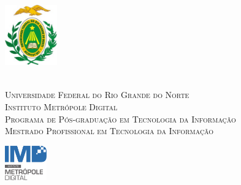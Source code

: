 

\begin{titlingpage}
	\begin{center}
		\hspace*{-1.5cm}
		\begin{minipage}{2.2cm}
			\begin{center}
				\includegraphics[width=2.25cm, height=2.68cm]{Imagens/Brasao-UFRN.jpg}
			\end{center}
		\end{minipage}
		\begin{minipage}{12.5cm}
			\begin{center}
					{\small \ \\
                       \textsc{Universidade Federal do Rio Grande do Norte}		   			\\
							  \textsc{Instituto Metrópole Digital}					\\
							  \textsc{Programa de Pós-graduação em Tecnologia da Informação}	\\
                       \textsc{Mestrado Profissional em Tecnologia da Informação}}   				\\
			\end{center}
		\end{minipage}
		\begin{minipage}{2.cm}
			\begin{center}
				\includegraphics[width=1.8cm, height=1.5cm]{Imagens/Logotipo-IMD}
			\end{center}
		\end{minipage}
			

\end{center}
\end{titlingpage}
